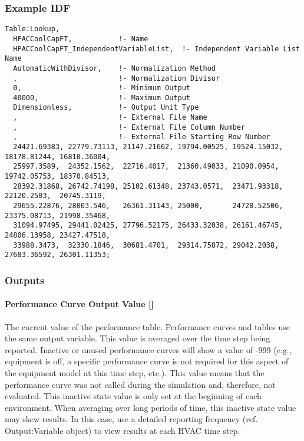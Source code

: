 \subsubsection{Example IDF}

\begin{lstlisting}
Table:Lookup,
  HPACCoolCapFT,           !- Name
  HPACCoolCapFT_IndependentVariableList,  !- Independent Variable List Name
  AutomaticWithDivisor,    !- Normalization Method
  ,                        !- Normalization Divisor
  0,                       !- Minimum Output
  40000,                   !- Maximum Output
  Dimensionless,           !- Output Unit Type
  ,                        !- External File Name
  ,                        !- External File Column Number
  ,                        !- External File Starting Row Number
  24421.69383, 22779.73113, 21147.21662, 19794.00525, 19524.15032, 18178.81244, 16810.36004,
  25997.3589,  24352.1562,  22716.4017,  21360.49033, 21090.0954,  19742.05753, 18370.84513,
  28392.31868, 26742.74198, 25102.61348, 23743.0571,  23471.93318, 22120.2503,  20745.3119,
  29655.22876, 28003.546,   26361.31143, 25000,       24728.52506, 23375.08713, 21998.35468,
  31094.97495, 29441.02425, 27796.52175, 26433.32038, 26161.46745, 24806.13958, 23427.47518,
  33988.3473,  32330.1846,  30681.4701,  29314.75872, 29042.2038,  27683.36592, 26301.11353;
\end{lstlisting}

\subsubsection{Outputs}

\paragraph{Performance Curve Output Value
{[}{]}}

The current value of the performance table. Performance curves and
tables use the same output variable. This value is averaged over the
time step being reported. Inactive or unused performance curves will
show a value of -999 (e.g., equipment is off, a specific performance
curve is not required for this aspect of the equipment model at this
time step, etc.). This value means that the performance curve was not
called during the simulation and, therefore, not evaluated. This
inactive state value is only set at the beginning of each environment.
When averaging over long periods of time, this inactive state value may
skew results. In this case, use a detailed reporting frequency (ref.
Output:Variable object) to view results at each HVAC time step.

